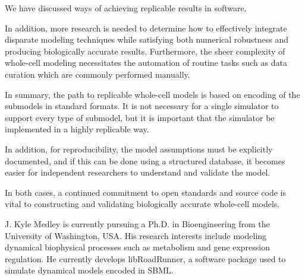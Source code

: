 \documentclass[journal,transmag,twoside]{IEEEtran}
\begin{document}
We have discussed ways of achieving replicable results in software.

In addition, more research is needed to determine how to effectively integrate disparate
modeling techniques while satisfying both numerical robustness and producing
biologically accurate results. Furthermore, the sheer complexity of whole-cell modeling necessitates 
the automation of routine tasks such as data curation which are commonly performed manually.

In summary, the path to replicable whole-cell models is based on
encoding of the submodels in standard formats. It is not necessary for a single simulator
to support every type of submodel, but it is important that the simulator
be implemented in a highly replicable way.

In addition, for reproducibility, the model assumptions must be explicitly
documented, and if this can be done using a structured database,
it becomes easier for independent researchers to understand and validate the model.

In both cases, a continued commitment to open standards and source code is vital
to constructing and validating biologically accurate whole-cell models.


\ifCLASSOPTIONcaptionsoff
  \newpage
\fi




\begin{IEEEbiography}{J. Kyle Medley}
is currently pursuing a Ph.D. in Bioengineering from the University of Washington, USA.
His research interests include modeling dynamical biophysical processes such as
metabolism and gene expression regulation.
He currently develops libRoadRunner, a software package used to simulate dynamical models encoded in SBML.
\end{IEEEbiography}
\end{document}
